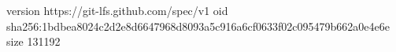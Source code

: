 version https://git-lfs.github.com/spec/v1
oid sha256:1bdbea8024c2d2e8d6647968d8093a5c916a6cf0633f02c095479b662a0e4e6e
size 131192
